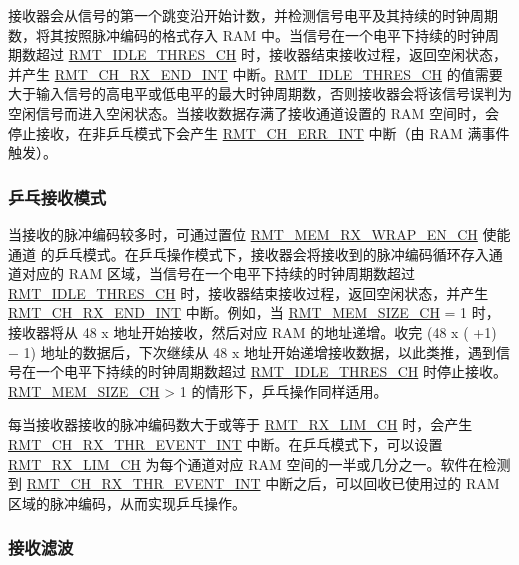 \documentclass[main\_\_CN.tex]{subfiles}
\begin{document}
接收器会从信号的第一个跳变沿开始计数，并检测信号电平及其持续的时钟周期数，将其按照脉冲编码的格式存入 RAM 中。当信号在一个电平下持续的时钟周期数超过 \hyperref[fielddesc:RMTIDLETHRESCHM]{RMT\_IDLE\_THRES\_CH} 时，接收器结束接收过程，返回空闲状态，并产生 \hyperref[int:RMTCHnRXENDINT]{RMT\_CH\_RX\_END\_INT} 中断。\hyperref[fielddesc:RMTIDLETHRESCHM]{RMT\_IDLE\_THRES\_CH} 的值需要大于输入信号的高电平或低电平的最大时钟周期数，否则接收器会将该信号误判为空闲信号而进入空闲状态。当接收数据存满了接收通道设置的 RAM 空间时，会停止接收，在非乒乓模式下会产生 \hyperref[int:RMTCHnERRINT]{RMT\_CH\_ERR\_INT} 中断（由 RAM 满事件触发）。


\subsubsection{乒乓接收模式}

当接收的脉冲编码较多时，可通过置位 \hyperref[fielddesc:RMTMEMRXWRAPENCHM]{RMT\_MEM\_RX\_WRAP\_EN\_CH} 使能通道  的乒乓模式。在乒乓操作模式下，接收器会将接收到的脉冲编码循环存入通道对应的 RAM 区域，当信号在一个电平下持续的时钟周期数超过 \hyperref[fielddesc:RMTIDLETHRESCHM]{RMT\_IDLE\_THRES\_CH} 时，接收器结束接收过程，返回空闲状态，并产生 \hyperref[int:RMTCHnRXENDINT]{RMT\_CH\_RX\_END\_INT} 中断。例如，当 \hyperref[fielddesc:RMTMEMSIZECHM]{RMT\_MEM\_SIZE\_CH} = 1 时，接收器将从 48 x  地址开始接收，然后对应 RAM 的地址递增。收完 (48 x ( +1) $-$ 1) 地址的数据后，下次继续从 48 x  地址开始递增接收数据，以此类推，遇到信号在一个电平下持续的时钟周期数超过 \hyperref[fielddesc:RMTIDLETHRESCHM]{RMT\_IDLE\_THRES\_CH} 时停止接收。\hyperref[fielddesc:RMTMEMSIZECHM]{RMT\_MEM\_SIZE\_CH} > 1 的情形下，乒乓操作同样适用。

每当接收器接收的脉冲编码数大于或等于 \hyperref[fielddesc:RMTRXLIMCHM]{RMT\_RX\_LIM\_CH} 时，会产生
\hyperref[int:RMTCHmRXTHREVENTINT]{RMT\_CH\_RX\_THR\_EVENT\_INT} 中断。在乒乓模式下，可以设置 \hyperref[fielddesc:RMTRXLIMCHM]{RMT\_RX\_LIM\_CH}
为每个通道对应 RAM 空间的一半或几分之一。软件在检测到 \hyperref[int:RMTCHmRXTHREVENTINT]{RMT\_CH\_RX\_THR\_EVENT\_INT}
中断之后，可以回收已使用过的 RAM 区域的脉冲编码，从而实现乒乓操作。


\subsubsection{接收滤波}
\end{document}
